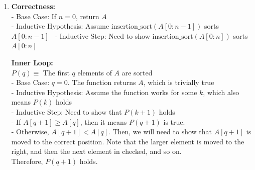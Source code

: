 \documentclass[a4paper]{article}
\begin{document}
\begin{enumerate}
\begin{enumerate}
        \newpage
        \item \textbf{Correctness:} \\
        - Base Case: If $n = 0$, return $A$ \\
        - Inductive Hypothesis: Assume $\text{insertion\_sort}(A[0:n-1])$ sorts $A[0:n-1]$ \
        - Inductive Step: Need to show $\text{insertion\_sort}(A[0:n])$ sorts $A[0:n]$ \

        \textbf{Inner Loop:} \\
        $P(q) \equiv$ The first $q$ elements of $A$ are sorted \\
        - Base Case: $q = 0$. The function returns $A$, which is trivially true \\
        - Inductive Hypothesis: Assume the function works for some $k$, which also means $P(k)$ holds \\
        - Inductive Step: Need to show that $P(k + 1)$ holds \\

        - If $A[q + 1] \geq A[q]$, then it means $P(q + 1)$ is true. \\
        - Otherwise, $A[q + 1] < A[q]$. Then, we will need to show that $A[q + 1]$ is moved to the correct position.
        Note that the larger element is moved to the right, and then the next element in checked, and so on. \\
        Therefore, $P(q + 1)$ holds. \\


\end{enumerate}
\end{enumerate}
\end{document}
